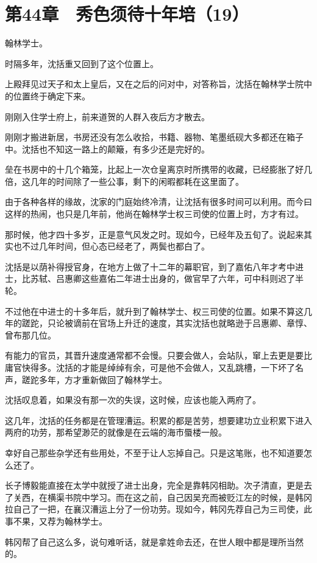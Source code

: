 \section{第44章　秀色须待十年培（19）}

翰林学士。

时隔多年，沈括重又回到了这个位置上。

上殿拜见过天子和太上皇后，又在之后的问对中，对答称旨，沈括在翰林学士院中的位置终于确定下来。

刚刚入住学士府上，前来道贺的人群入夜后方才散去。

刚刚才搬进新居，书房还没有怎么收拾，书籍、器物、笔墨纸砚大多都还在箱子中。沈括也不知这一路上的颠簸，有多少还是完好的。

垒在书房中的十几个箱笼，比起上一次仓皇离京时所携带的收藏，已经膨胀了好几倍，这几年的时间除了一些公事，剩下的闲暇都耗在这里面了。

由于各种各样的缘故，沈家的门庭始终冷清，让沈括有很多时间可以利用。而今曰这样的热闹，也只是几年前，他尚在翰林学士权三司使的位置上时，方才有过。

那时候，他才四十多岁，正是意气风发之时。现如今，已经年及五旬了。说起来其实也不过几年时间，但心态已经老了，两鬓也都白了。

沈括是以荫补得授官身，在地方上做了十二年的幕职官，到了嘉佑八年才考中进士，比苏轼、吕惠卿这些嘉佑二年进士出身的，做官早了六年，可中科则迟了半轮。

不过他在中进士的十多年后，就升到了翰林学士、权三司使的位置。如果不算这几年的蹉跎，只论被谪前在官场上升迁的速度，其实沈括也就略逊于吕惠卿、章惇、曾布那几位。

有能力的官员，其晋升速度通常都不会慢。只要会做人，会站队，窜上去更是要比庸官快得多。沈括的才能是绰绰有余，可是他不会做人，又乱跳槽，一下坏了名声，蹉跎多年，方才重新做回了翰林学士。

沈括叹息着，如果没有那一次的失误，这时候，应该也能入两府了。

这几年，沈括的任务都是在管理漕运。积累的都是苦劳，想要建功立业积累下进入两府的功劳，那希望渺茫的就像是在云端的海市蜃楼一般。

幸好自己那些杂学还有些用处，不至于让人忘掉自己。只是这笔账，也不知道要怎么还了。

长子博毅能直接在太学中就授了进士出身，完全是靠韩冈相助。次子清直，更是去了关西，在横渠书院中学习。而在这之前，自己因吴充而被贬江左的时候，是韩冈拉自己了一把，在襄汉漕运上分了一份功劳。现如今，韩冈先荐自己为三司使，此事不果，又荐为翰林学士。

韩冈帮了自己这么多，说句难听话，就是拿姓命去还，在世人眼中都是理所当然的。

